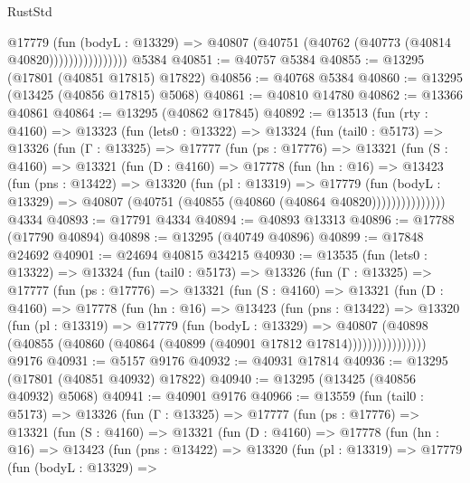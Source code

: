 \begin{lexlean}{RustStd}
\begin{coremodule}
                        @17779
                          (fun (bodyL : @13329) =>
                          @40807 (@40751 (@40762 (@40773 (@40814 @40820))))))))))))))))
    @5384
@40851 := @40757 @5384
@40855 := @13295 (@17801 (@40851 @17815) @17822)
@40856 := @40768 @5384
@40860 := @13295 (@13425 (@40856 @17815) @5068)
@40861 := @40810 @14780
@40862 := @13366 @40861
@40864 := @13295 (@40862 @17845)
@40892 := @13513
    (fun (rty : @4160) =>
    @13323
      (fun (lets0 : @13322) =>
      @13324
        (fun (tail0 : @5173) =>
        @13326
          (fun (Γ : @13325) =>
          @17777
            (fun (ps : @17776) =>
            @13321
              (fun (S : @4160) =>
              @13321
                (fun (D : @4160) =>
                @17778
                  (fun (hn : @16) =>
                  @13423
                    (fun (pns : @13422) =>
                    @13320
                      (fun (pl : @13319) =>
                      @17779
                        (fun (bodyL : @13329) =>
                        @40807 (@40751 (@40855 (@40860 (@40864 @40820)))))))))))))))
    @4334
@40893 := @17791 @4334
@40894 := @40893 @13313
@40896 := @17788 (@17790 @40894)
@40898 := @13295 (@40749 @40896)
@40899 := @17848 @24692
@40901 := @24694 @40815 @34215
@40930 := @13535
    (fun (lets0 : @13322) =>
    @13324
      (fun (tail0 : @5173) =>
      @13326
        (fun (Γ : @13325) =>
        @17777
          (fun (ps : @17776) =>
          @13321
            (fun (S : @4160) =>
            @13321
              (fun (D : @4160) =>
              @17778
                (fun (hn : @16) =>
                @13423
                  (fun (pns : @13422) =>
                  @13320
                    (fun (pl : @13319) =>
                    @17779
                      (fun (bodyL : @13329) =>
                      @40807
                        (@40898
                          (@40855 (@40860 (@40864 (@40899 (@40901 @17812 @17814))))))))))))))))
    @9176
@40931 := @5157 @9176
@40932 := @40931 @17814
@40936 := @13295 (@17801 (@40851 @40932) @17822)
@40940 := @13295 (@13425 (@40856 @40932) @5068)
@40941 := @40901 @9176
@40966 := @13559
    (fun (tail0 : @5173) =>
    @13326
      (fun (Γ : @13325) =>
      @17777
        (fun (ps : @17776) =>
        @13321
          (fun (S : @4160) =>
          @13321
            (fun (D : @4160) =>
            @17778
              (fun (hn : @16) =>
              @13423
                (fun (pns : @13422) =>
                @13320
                  (fun (pl : @13319) =>
                  @17779
                    (fun (bodyL : @13329) =>

\end{coremodule}
\end{lexlean}
